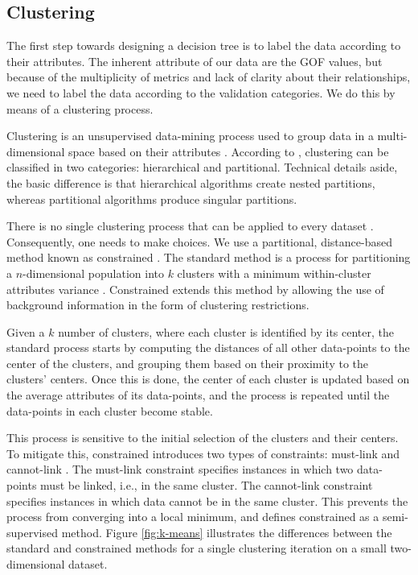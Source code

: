 \subsection{Clustering}
\label{sec:clustering}

The first step towards designing a decision tree is to label the data according to their attributes. The inherent attribute of our data are the GOF values, but because of the multiplicity of metrics and lack of clarity about their relationships, we need to label the data according to the validation categories. We do this by means of a clustering process. 

Clustering is an unsupervised data-mining process used to group data in a multi-dimensional space based on their attributes \citep{Fayyad_1996_IEEE}. According to \citet{Jain_1999_ACMCS}, clustering can be classified in two categories: hierarchical and partitional. Technical details aside, the basic difference is that hierarchical algorithms create nested partitions, whereas partitional algorithms produce singular partitions. 

There is no single clustering process that can be applied to every dataset \citep{Dy_2004_MLR, Jain_1988_Book, Hartigan_1985_JOC}. Consequently, one needs to make choices. We use a partitional, distance-based method known as constrained \kmeans{}. The standard \kmeans{} method is a process for partitioning a $n$-dimensional population into $k$ clusters with a minimum within-cluster attributes variance \citep[e.g.,][]{Macqueen_1967_Proc}. Constrained \kmeans{} extends this method by allowing the use of background information in the form of clustering restrictions.

Given a $k$ number of clusters, where each cluster is identified by its center, the standard process starts by computing the distances of all other data-points to the center of the clusters, and grouping them based on their proximity to the clusters' centers. Once this is done, the center of each cluster is updated based on the average attributes of its data-points, and the process is repeated until the data-points in each cluster become stable. 

This process is sensitive to the initial selection of the clusters and their centers. To mitigate this, constrained \kmeans{} introduces two types of constraints: must-link and cannot-link \citep{Wagstaff_2001_Proc}. The must-link constraint specifies instances in which two data-points must be linked, i.e., in the same cluster. The cannot-link constraint specifies instances in which data cannot be in the same cluster. This prevents the process from converging into a local minimum, and defines constrained \kmeans{} as a semi-supervised method. Figure \ref{fig:k-means} illustrates the differences between the standard and constrained \kmeans{} methods for a single clustering iteration on a small two-dimensional dataset.

